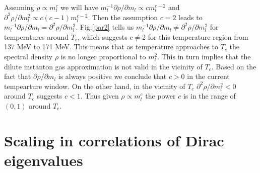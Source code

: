 \documentclass[a4paper,11pt]{article}
\numberwithin{equation}{section}
\begin{document}
Assuming $\rho\propto m_l^c$ we will have $m_{l}^{-1} \partial \rho / \partial m_{l}\propto cm_l^{c-2}$ and $\partial^{2} \rho / \partial m_{l}^{2}\propto c(c-1)m_l^{c-2}$. 
Then the assumption $c=2$ leads to $m_{l}^{-1} \partial \rho / \partial m_{l} = \partial^{2} \rho / \partial m_{l}^{2}$.
Fig.\ref{par2} tells us $m_{l}^{-1} \partial \rho / \partial m_{l} \neq \partial^{2} \rho / \partial m_{l}^{2}$ for temperatures around $T_c$, which suggests $c \neq 2$ for this temperature region from 137 MeV to 171 MeV. This means that as temperature approaches to $T_c$  the spectral density $\rho$ is no longer proportional to $m_l^2$.
This in turn implies that the dilute instanton gas approximation is not valid in the vicinity of $T_c$.
Based on the fact that $\partial \rho / \partial m_{l}$ is always positive we conclude that $c>0$ in the current tempearture window. 
On the other hand, in the vicinity of $T_c$ $\partial^{2} \rho / \partial m_{l}^{2} <0$ around $T_c$ suggests $c<1$. Thus given $\rho \propto m_l^c$ the power $c$ is in the range of $(0,1)$ around $T_c$.














\section{Scaling in correlations of Dirac eigenvalues}
\end{document}
